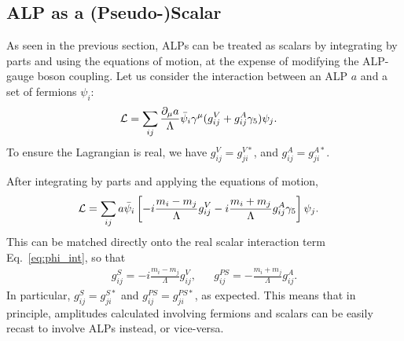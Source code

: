 {\subsection{ALP as a (Pseudo-)Scalar}\label{sec:ALP_as_pseudoscalar}
As seen in the previous section, ALPs can be treated as scalars by integrating by parts and using the equations of motion, at the expense of modifying the ALP-gauge boson coupling. Let us consider the interaction between an ALP $a$ and a set of fermions $\psi_i$:
\begin{align}
    {\cal L} &= \sum_{ij}\frac{\partial_\mu a}{\Lambda}\bar{\psi}_i\gamma^\mu(g^V_{ij} + g^A_{ij}\gamma_5)\psi_j.
\end{align}
To ensure the Lagrangian is real, we have $g_{ij}^{V}=g_{ji}^{V*}$, and $g_{ij}^{A} = g_{ji}^{A*}$.

After integrating by parts and applying the equations of motion, 
\begin{align}
    {\cal L} &= \sum_{ij}a\bar{\psi}_i\left[-i\frac{m_i - m_j}{\Lambda}g^V_{ij} -i\frac{m_i + m_j}{\Lambda}g^A_{ij}\gamma_5\right]\psi_j.
\end{align}
This can be matched directly onto the real scalar interaction term Eq.~\ref{eq:phi_int}, so that
\begin{align}
    g_{ij}^S = -i\frac{m_i-m_j}{\Lambda}g_{ij}^V, & &
    g_{ij}^{PS} = -\frac{m_i+m_j}{\Lambda}g_{ij}^A.
\end{align}
In particular, $g_{ij}^S = g_{ji}^{S*}$ and $g_{ij}^{PS} = g_{ji}^{PS*}$, as expected. This means that in principle, amplitudes calculated involving fermions and scalars can be easily recast to involve ALPs instead, or vice-versa. 

}
